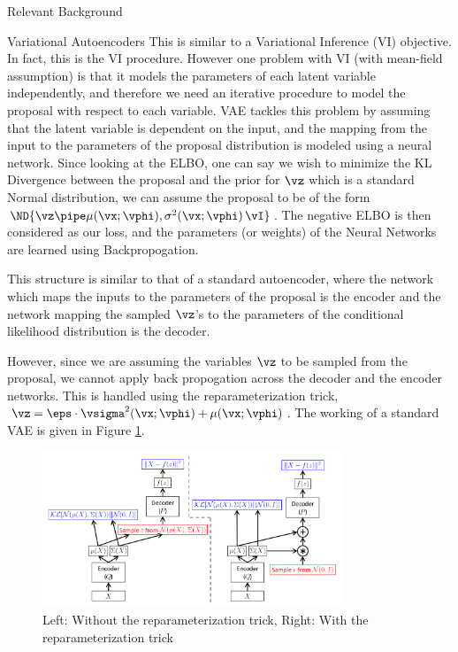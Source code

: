 \documentclass{article}
\begin{document}
\begin{psection}{Relevant Background}
\begin{psubsection}{Variational Autoencoders}
		This is similar to a Variational Inference (VI) objective. In fact, this is the VI procedure. However one problem with VI (with mean-field assumption) is that it models the parameters of each latent variable independently, and therefore we need an iterative procedure to model the proposal with respect to each variable. VAE tackles this problem by assuming that the latent variable is dependent on the input, and the mapping from the input to the parameters of the proposal distribution is modeled using a neural network. Since looking at the ELBO, one can say we wish to minimize the KL Divergence between the proposal and the prior for $\vz$ which is a standard Normal distribution, we can assume the proposal to be of the form $\ND{\vz \pipe \mu(\vx; \vphi), \sigma^2(\vx; \vphi)\,\vI}$. The negative ELBO is then considered as our loss, and the parameters (or weights) of the Neural Networks are learned using Backpropogation.

		This structure is similar to that of a standard autoencoder, where the network which maps the inputs to the parameters of the proposal is the encoder and the network mapping the sampled $\vz$'s to the parameters of the conditional likelihood distribution is the decoder.

		However, since we are assuming the variables $\vz$ to be sampled from the proposal, we cannot apply back propogation across the decoder and the encoder networks. This is handled using the reparameterization trick, $\vz = \eps \cdot \vsigma^2(\vx; \vphi) + \mu(\vx; \vphi)$. The working of a standard VAE is given in Figure \ref{fig:vae}.

		\begin{figure}[t]
			\centering
			\includegraphics[width=0.8\textwidth]{includes/vae.png}
			\caption{Left: Without the reparameterization trick, Right: With the reparameterization trick}
			\label{fig:vae}
		\end{figure}

	\end{psubsection}


\end{psection}
\end{document}
